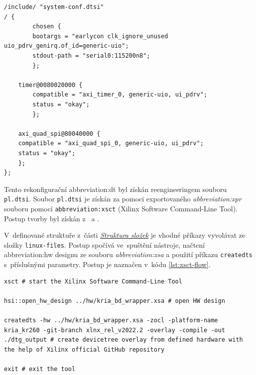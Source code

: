 \documentclass[a4paper, twoside, 11pt]{article}
\begin{document}
		\begin{lstlisting}[language={devicetree}, caption={Obsah souboru system-user.dtsi, překonfigurovávající soubor system-conf.dtsi.}, label= {lst:system-user-dtsi-device-tree}]
/include/ "system-conf.dtsi"
/ {
        chosen {
        bootargs = "earlycon clk_ignore_unused   uio_pdrv_genirq.of_id=generic-uio";
        stdout-path = "serial0:115200n8";
        };

    timer@0080020000 {
        compatible = "axi_timer_0, generic-uio, ui_pdrv";
        status = "okay";
        };

    axi_quad_spi@80040000 {
    compatible = "axi_quad_spi_0, generic-uio, ui_pdrv";
    status = "okay";
    };
};\end{lstlisting}

			Tento rekonfigurační \gls{abbreviation:dt} byl získán reengineeringem souboru \texttt{pl.dtsi}. Soubor \texttt{pl.dtsi} je získán za pomoci exportovaného \textit{\gls{abbreviation:xpr}} souboru pomocí \texttt{\gls{abbreviation:xsct}} (Xilinx Software Command-Line Tool). Postup tvorby byl získán z~\cite{xilinx-github-vitis-tutorials-step-2-create-the-software-components} a \cite{hackster-getting-started-with-the-kria-kr260-in-petalinux}.\par
			V~definované struktuře z~části \hyperref[sec:struktura-slozek]{\textit{Struktura složek}} je vhodné příkazy vyvolávat ze složky \texttt{linux-files}. Postup spočívá ve~spuštění nástroje, načtení \gls{abbreviation:hw} designu ze souboru \textit{\gls{abbreviation:xsa}} a použití příkazu \texttt{createdts} s~příslušnými parametry. Postup je naznačen v~kódu \ref{lst:xsct-flow}.\par

		\begin{lstlisting}[language={xsct}, caption={Postup tvorby pl.dtsi souboru pomocí \gls{abbreviation:xsct}, popisující \gls{abbreviation:dt} při běžícím PetaLinux.}, label= {lst:xsct-flow}]
xsct # start the Xilinx Software Command-Line Tool

hsi::open_hw_design ../hw/kria_bd_wrapper.xsa # open HW design

createdts -hw ../hw/kria_bd_wrapper.xsa -zocl -platform-name kria_kr260 -git-branch xlnx_rel_v2022.2 -overlay -compile -out ./dtg_output # create devicetree overlay from defined hardware with the help of Xilinx official GitHub repository

exit # exit the tool\end{lstlisting}
\end{document}
